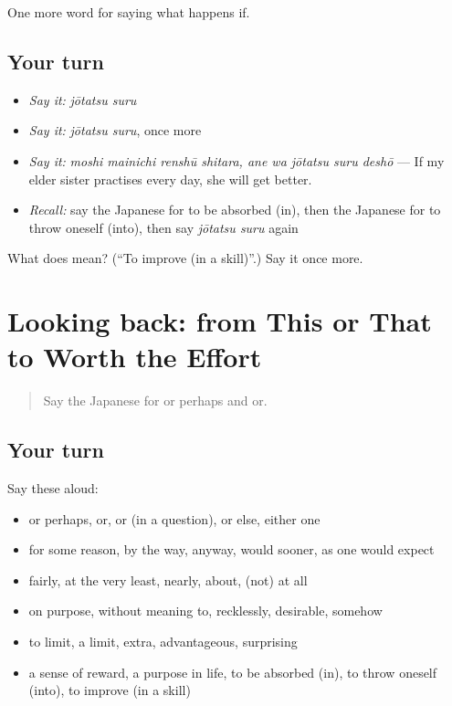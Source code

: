 \begin{grammarlens}[title={What you've built}]
One more word for saying what happens if.
\end{grammarlens}

\subsection*{Your turn}
\begin{itemize}
\raggedright
  \item \emph{Say it:} \emph{jōtatsu suru}
  \item \emph{Say it:} \emph{jōtatsu suru}, once more
  \item \emph{Say it:} \emph{moshi mainichi renshū shitara, ane wa jōtatsu suru deshō} — If my elder sister practises every day, she will get better.
  \item \emph{Recall:} say the Japanese for to be absorbed (in), then the Japanese for to throw oneself (into), then say \emph{jōtatsu suru} again
\end{itemize}

\begin{tcolorbox}[breakable,colback=teal!4,colframe=teal!35!black,title={Before you move on}]
What does  mean? (\textquotedblleft{}To improve (in a skill)\textquotedblright{}.) Say it once more.
\end{tcolorbox}
\section[(dialogue)]{Looking back: from This or That to Worth the Effort}

\label{lesson:JA-R533-review-528-533}



\begin{quote}
Say the Japanese for or perhaps and or.
\end{quote}

\subsection*{Your turn}
Say these aloud:

\begin{itemize}
\raggedright
  \item or perhaps, or, or (in a question), or else, either one
  \item for some reason, by the way, anyway, would sooner, as one would expect
  \item fairly, at the very least, nearly, about, (not) at all
  \item on purpose, without meaning to, recklessly, desirable, somehow
  \item to limit, a limit, extra, advantageous, surprising
  \item a sense of reward, a purpose in life, to be absorbed (in), to throw oneself (into), to improve (in a skill)
\end{itemize}

